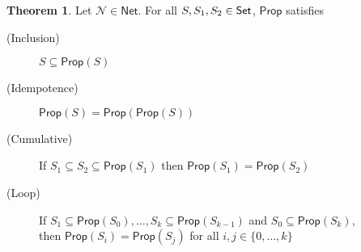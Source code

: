 \documentclass[letterpaper]{article}
\theoremstyle{definition}
\newtheorem{theorem}{Theorem}
\newcommand{\Set}{\mbox{\sf Set}}
\newcommand{\set}[1]{\{ #1 \}}
\newcommand{\Prop}{\textsf{Prop}}
\newcommand{\AllNets}{\mathsf{Net}}
\newcommand{\Net}{\mathcal{N}}
\begin{document}
\begin{theorem}
\label{thm:prop-props}
Let $\Net \in \AllNets$.  For all $S, S_1, S_2 \in \Set$, $\Prop$ satisfies
\begin{description}
    \item[(Inclusion)] $S \subseteq \Prop(S)$
    
    \item[(Idempotence)] $\Prop(S) = \Prop(\Prop(S))$
    
    \item[(Cumulative)] If ${S_1 \subseteq S_2 \subseteq \Prop(S_1)}$ then ${\Prop(S_1) = \Prop(S_2)}$
    
    \item[(Loop)] If ${S_1 \subseteq \Prop(S_0)}, \ldots, {S_k \subseteq \Prop(S_{k-1})}$ and ${S_0 \subseteq \Prop(S_k)}$,\\ then ${\Prop(S_i) = \Prop(S_j)}$
    for all $i, j \in \set{0, \ldots, k}$
\end{description}
\end{theorem}
\end{document}
